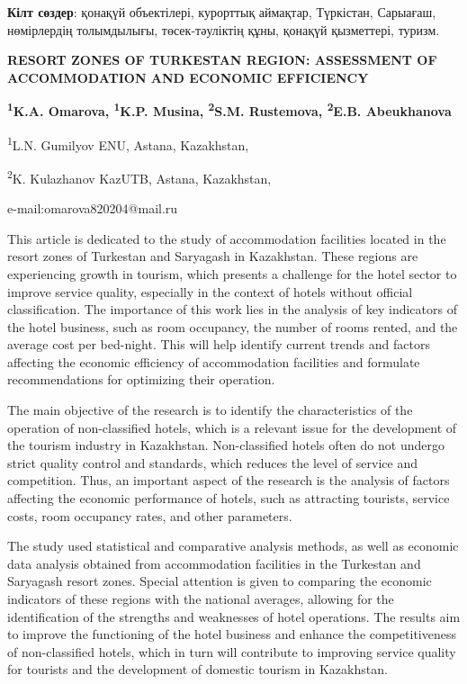 {\bfseries Кілт сөздер}: қонақүй объектілері, курорттық аймақтар,
Түркістан, Сарыағаш, нөмірлердің толымдылығы, төсек-тәуліктің құны,
қонақүй қызметтері, туризм.

\begin{articleheader}
{\bfseries RESORT ZONES OF TURKESTAN REGION: ASSESSMENT OF ACCOMMODATION
AND ECONOMIC EFFICIENCY}

{\bfseries
\textsuperscript{1}K.A. Omarova\textsuperscript{\envelope },
\textsuperscript{1}K.P. Musina,
\textsuperscript{2}S.M. Rustemova,
\textsuperscript{2}E.B. Abeukhanova
}
\end{articleheader}

\begin{affiliation}
\textsuperscript{1}L.N. Gumilyov ENU, Astana, Kazakhstan,

\textsuperscript{2}K. Kulazhanov KazUTB, Astana, Kazakhstan,

e-mail:omarova820204@mail.ru
\end{affiliation}

This article is dedicated to the study of accommodation facilities
located in the resort zones of Turkestan and Saryagash in Kazakhstan.
These regions are experiencing growth in tourism, which presents a
challenge for the hotel sector to improve service quality, especially in
the context of hotels without official classific\-ation. The importance of
this work lies in the analysis of key indicators of the hotel business,
such as room occupancy, the number of rooms rented, and the average cost
per bed-night. This will help identify current trends and factors
affecting the economic efficiency of accommodation facilities and
formulate recommendations for optimizing their operation.

The main objective of the research is to identify the characteristics of
the operation of non-classified hotels, which is a relevant issue for
the development of the tourism industry in Kazakhstan. Non-classified
hotels often do not undergo strict quality control and standards, which
reduces the level of service and competition. Thus, an important aspect
of the research is the analysis of factors affecting the economic
performance of hotels, such as attracting tourists, service costs, room
occupancy rates, and other parameters.

The study used statistical and comparative analysis methods, as well as
economic data analysis obtained from accommodation facilities in the
Turkestan and Saryagash resort zones. Special attention is given to
comparing the economic indicators of these regions with the national
averages, allowing for the identifica\-tion of the strengths and
weaknesses of hotel operations. The results aim to improve the
functioning of the hotel business and enhance the competitiveness of
non-classified hotels, which in turn will contribute to improving
service quality for tourists and the development of domestic tourism in
Kazakhstan.

